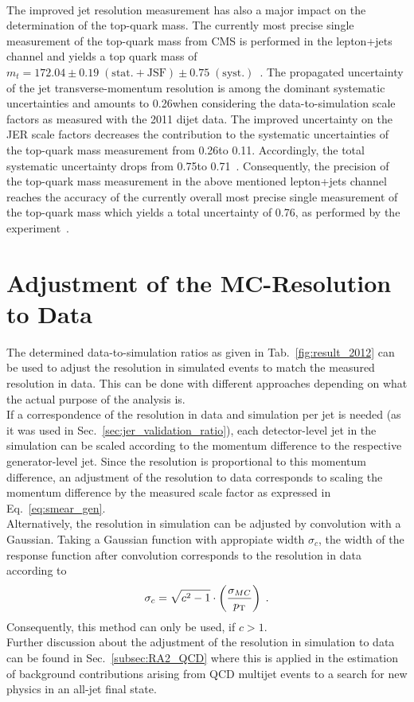 \\
The improved jet resolution measurement has also a major impact on the determination of the top-quark mass. The currently most precise single measurement of the top-quark mass from CMS is performed in the lepton+jets channel and yields a top quark mass of $m_t = 172.04 \pm 0.19\; \mathrm{(stat.+JSF)} \pm 0.75\;\mathrm{(syst.)}$\gev~\cite{CMS-PAS-TOP-14-001}. The propagated uncertainty of the jet transverse-momentum resolution is among the dominant systematic uncertainties and amounts to 0.26\gev when considering the data-to-simulation scale factors as measured with the 2011 dijet data. The improved uncertainty on the JER scale factors decreases the contribution to the systematic uncertainties of the top-quark mass measurement from 0.26\gev to 0.11\gev. Accordingly, the total systematic uncertainty drops from 0.75\gev to 0.71\gev~\cite{MSeidel}. Consequently, the precision of the top-quark mass measurement in the above mentioned lepton+jets channel reaches the accuracy of the currently overall most precise single measurement of the top-quark mass which yields a total uncertainty of 0.76\gev, as performed by the \dzero experiment~\cite{Abazov:2014dpa}.   

\section{Adjustment of the MC-Resolution to Data}
\label{sec:jer_adjustment}
The determined data-to-simulation ratios as given in Tab.~\ref{fig:result_2012} can be used to adjust the resolution in simulated events to match the measured resolution in data. This can be done with different approaches depending on what the actual purpose of the analysis is. \\
If a correspondence of the resolution in data and simulation per jet is needed (as it was used in Sec.~\ref{sec:jer_validation_ratio}), each detector-level jet in the simulation can be scaled according to the momentum difference to the respective generator-level jet. Since the resolution is proportional to this momentum difference, an adjustment of the resolution to data corresponds to scaling the momentum difference by the measured scale factor as expressed in Eq.~\ref{eq:smear_gen}. \\
Alternatively, the resolution in simulation can be adjusted by convolution with a Gaussian. Taking a Gaussian function with appropiate width $\sigma_{c}$, the width of the response function after convolution corresponds to the resolution in data according to 
\begin{equation}
\sigma_{c} = \sqrt{c^2-1} \cdot \left( \frac{\sigma_{MC}}{p_{\text{T}}} \right) \; .
\label{eq:res_adjust}
\end{equation}
Consequently, this method can only be used, if $c > 1$. \\
Further discussion about the adjustment of the resolution in simulation to data can be found in Sec.~\ref{subsec:RA2_QCD} where this is applied in the estimation of background contributions arising from QCD multijet events to a search for new physics in an all-jet final state.  

